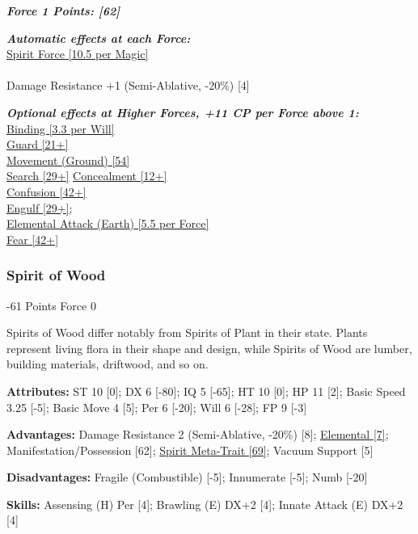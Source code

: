 \begin{multicols}{3}
	\textbf{\textit{Force 1 Points: [62]}}
	
	\textbf{\textit{Automatic effects at each Force:\\}}
	\hyperref[spirit_force]{Spirit Force [10.5 per Magic]}\\\\
	Damage Resistance +1 (Semi-Ablative, -20\%) [4]
	
	\textbf{\textit{Optional effects at Higher Forces, +11 CP per Force above 1:\\}}	
	\hyperref[binding]{Binding [3.3 per Will]}\\
	\hyperref[guard]{Guard [21+]}\\
	\hyperref[movement]{Movement (Ground) [54]}\\
	\hyperref[search]{Search [29+]}	
	\hyperref[concealment]{Concealment [12+]}\\
	\hyperref[confusion]{Confusion [42+]}\\
	\hyperref[engulf]{Engulf [29+];}\\
	\hyperref[elemental_attack]{Elemental Attack (Earth) [5.5 per Force]}\\
	\hyperref[fear]{Fear [42+]}\\
	
	\subsubsection*{Spirit of Wood}
	\begin{flushright}
		-61 Points Force 0
	\end{flushright}

	Spirits of Wood differ notably from Spirits of Plant in their state. Plants represent living flora in their shape and design, while Spirits of Wood are lumber, building materials, driftwood, and so on.
	
	\textbf{Attributes:}
	ST 10 [0]; DX 6 [-80]; IQ 5 [-65]; HT 10 [0]; HP 11 [2]; Basic Speed 3.25 [-5]; Basic Move 4 [5]; Per 6 [-20]; Will 6 [-28]; FP 9 [-3]
	
	\textbf{Advantages:}
	Damage Resistance 2 (Semi-Ablative, -20\%) [8]; \hyperref[elemental]{Elemental [7]}; Manifestation/Possession [62]; \hyperref[spirit_meta_trait]{Spirit Meta-Trait [69]}; Vacuum Support [5]
	
	\textbf{Disadvantages:}
	Fragile (Combustible) [-5]; Innumerate [-5]; Numb [-20]
	
	\textbf{Skills:}
	Assensing (H) Per [4]; Brawling (E) DX+2 [4]; Innate Attack (E) DX+2 [4]
	

\end{multicols}
